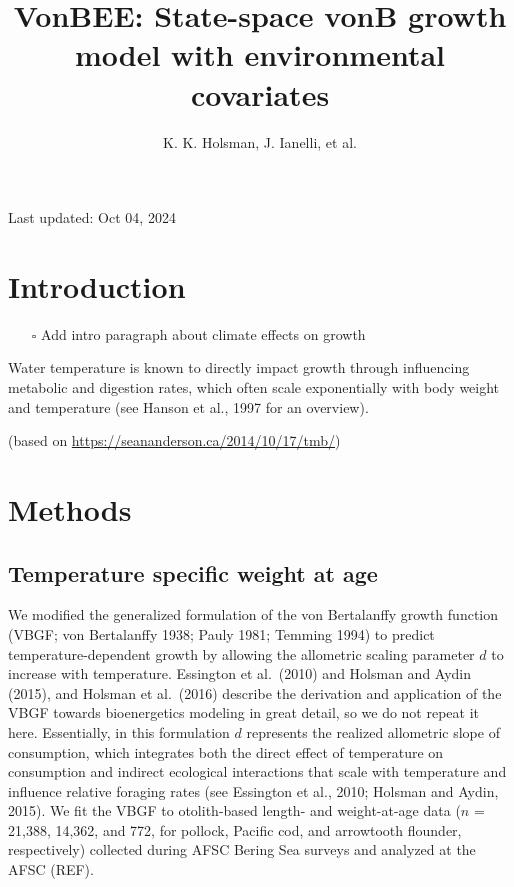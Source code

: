 \documentclass[
]{article}
\title{VonBEE: State-space vonB growth model with environmental
covariates}
\author{K. K. Holsman, J. Ianelli, et al.}
\date{}
\providecommand{\tightlist}{%
  \setlength{\itemsep}{0pt}\setlength{\parskip}{0pt}}
\begin{document}
\maketitle

{
\setcounter{tocdepth}{2}
\tableofcontents
}
Last updated: Oct 04, 2024

\section{Introduction}\label{introduction}

\begin{itemize}
\tightlist
\item[$\square$]
  Add intro paragraph about climate effects on growth
\end{itemize}

Water temperature is known to directly impact growth through influencing
metabolic and digestion rates, which often scale exponentially with body
weight and temperature (see Hanson et al., 1997 for an overview).

(based on \url{https://seananderson.ca/2014/10/17/tmb/})

\section{Methods}\label{methods}

\subsection{Temperature specific weight at
age}\label{temperature-specific-weight-at-age}

We modified the generalized formulation of the von Bertalanffy growth
function (VBGF; von Bertalanffy 1938; Pauly 1981; Temming 1994) to
predict temperature-dependent growth by allowing the allometric scaling
parameter \(d\) to increase with temperature. Essington et al.~(2010)
and Holsman and Aydin (2015), and Holsman et al.~(2016) describe the
derivation and application of the VBGF towards bioenergetics modeling in
great detail, so we do not repeat it here. Essentially, in this
formulation \(d\) represents the realized allometric slope of
consumption, which integrates both the direct effect of temperature on
consumption and indirect ecological interactions that scale with
temperature and influence relative foraging rates (see Essington et al.,
2010; Holsman and Aydin, 2015). We fit the VBGF to otolith-based length-
and weight-at-age data (\(n\) = 21,388, 14,362, and 772, for pollock,
Pacific cod, and arrowtooth flounder, respectively) collected during
AFSC Bering Sea surveys and analyzed at the AFSC (REF).
\end{document}
